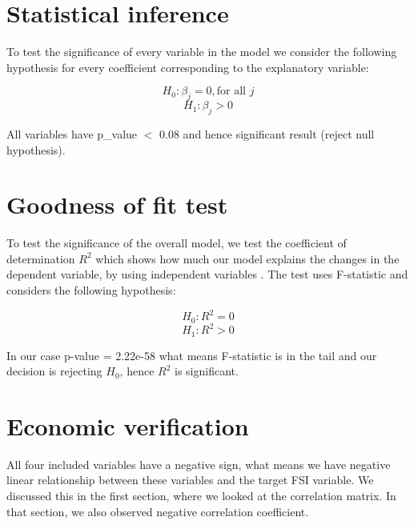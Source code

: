 \documentclass{article}
\begin{document}

\section{Statistical inference}
To test the significance of every variable in the model we consider the following hypothesis for every coefficient corresponding to the explanatory variable:

$$H_0: \beta_j = 0, \text{for all } j$$
$$H_1: \beta_j > 0$$

All variables have p\_value $<$ 0.08 and hence significant result (reject null hypothesis). 

\section{Goodness of fit test}
\label{good}
To test the significance of the overall model, we test the coefficient of determination $R^2$ which shows how much our model explains the changes in the dependent variable, by using independent variables \cite{Lect}. The test uses F-statistic and considers the following hypothesis:

$$H_0: R^2 = 0$$
$$H_1: R^2 > 0$$

In our case p-value = 2.22e-58 what means F-statistic is in the tail and our decision is rejecting $H_0$, hence $R^2$ is significant.

\section{Economic verification}
All four included variables have a negative sign, what means we have negative linear relationship between these variables and the target FSI variable. We discussed this in the first section, where we looked at the correlation matrix. In that section, we also observed negative correlation coefficient.\\
\end{document}

